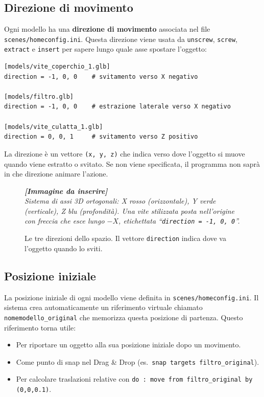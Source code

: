 ﻿\documentclass[a4paper,12pt,oneside]{book}
\newcommand{\kw}[1]{\texttt{\color{keycolor}#1}}
\newcommand{\val}[1]{\texttt{\color{cvtgreen}#1}}
\newcommand{\file}[1]{\texttt{#1}}
\newcommand{\imgph}[2]{%
  \begin{tcolorbox}[colback=cvtlightblue!30,colframe=cvtblue!40,%
    width=#1,halign=center,valign=center,height=5cm,boxrule=0.5pt,arc=3pt]%
    \textcolor{cvtgray}{\itshape\footnotesize\textbf{[Immagine da inserire]}\\[3pt]#2}%
  \end{tcolorbox}}
\begin{document}
\subsection{Direzione di movimento}

Ogni modello ha una \textbf{direzione di movimento} associata nel file
\file{scenes/homeconfig.ini}. Questa direzione viene usata da
\val{unscrew}, \val{screw}, \val{extract} e \val{insert} per sapere
lungo quale asse spostare l'oggetto:

\begin{lstlisting}
[models/vite_coperchio_1.glb]
direction = -1, 0, 0    # svitamento verso X negativo

[models/filtro.glb]
direction = -1, 0, 0    # estrazione laterale verso X negativo

[models/vite_culatta_1.glb]
direction = 0, 0, 1     # svitamento verso Z positivo
\end{lstlisting}

\begin{notablu}[Ricorda]
La direzione è un vettore \texttt{(x,~y,~z)} che indica verso dove
l'oggetto si muove quando viene estratto o svitato. Se non viene
specificata, il programma non saprà in che direzione animare l'azione.
\end{notablu}

\begin{figure}[H]
  \centering
  \imgph{10cm}{Sistema di assi 3D ortogonali: X rosso (orizzontale), Y verde (verticale), Z blu (profondità). Una vite stilizzata posta nell'origine con freccia che esce lungo $-X$, etichettata ``\texttt{direction = -1, 0, 0}''.}
  \caption{Le tre direzioni dello spazio. Il vettore \texttt{direction} indica dove va l'oggetto quando lo sviti.}
  \label{fig:sistema-xyz}
\end{figure}

\subsection{Posizione iniziale}

La posizione iniziale di ogni modello viene definita in
\file{scenes/homeconfig.ini}. Il sistema crea automaticamente un
riferimento virtuale chiamato \texttt{nomemodello\_original} che
memorizza questa posizione di partenza. Questo riferimento torna utile:

\begin{itemize}
  \item Per riportare un oggetto alla sua posizione iniziale dopo un
        movimento.
  \item Come punto di snap nel Drag \& Drop
        (es.\ \texttt{snap targets filtro\_original}).
  \item Per calcolare traslazioni relative con
        \kw{do : move from filtro\_original by (0,0,0.1)}.
\end{itemize}
\end{document}
